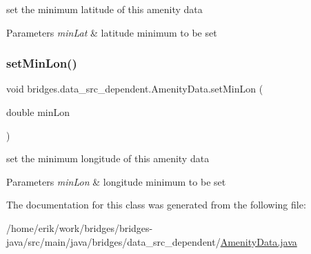 set the minimum latitude of this amenity data 
\begin{DoxyParams}{Parameters}
{\em min\+Lat} & latitude minimum to be set \\
\hline
\end{DoxyParams}
\mbox{\label{classbridges_1_1data__src__dependent_1_1_amenity_data_af71873ec7280c3f818ef2c3d51c42d3c}} 
\subsubsection{\texorpdfstring{set\+Min\+Lon()}{setMinLon()}}
{\footnotesize\ttfamily void bridges.\+data\+\_\+src\+\_\+dependent.\+Amenity\+Data.\+set\+Min\+Lon (\begin{DoxyParamCaption}\item[{double}]{min\+Lon }\end{DoxyParamCaption})}

set the minimum longitude of this amenity data 
\begin{DoxyParams}{Parameters}
{\em min\+Lon} & longitude minimum to be set \\
\hline
\end{DoxyParams}


The documentation for this class was generated from the following file\+:\begin{DoxyCompactItemize}
\item 
/home/erik/work/bridges/bridges-\/java/src/main/java/bridges/data\+\_\+src\+\_\+dependent/\hyperlink{_amenity_data_8java}{Amenity\+Data.\+java}\end{DoxyCompactItemize}
